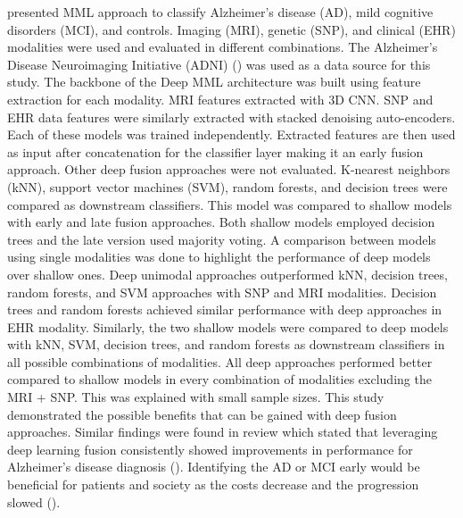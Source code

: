 \cite{alzmulti} presented MML approach to classify Alzheimer’s disease (AD), mild cognitive disorders (MCI), and controls. Imaging (MRI), genetic (SNP), and clinical (EHR) modalities were used and evaluated in different combinations. The Alzheimer’s Disease Neuroimaging Initiative (ADNI) (\cite{ADNI}) was used as a data source for this study. The backbone of the Deep MML architecture was built using feature extraction for each modality. MRI features extracted with 3D CNN. SNP and EHR data features were similarly extracted with stacked denoising auto-encoders. Each of these models was trained independently. Extracted features are then used as input after concatenation for the classifier layer making it an early fusion approach. Other deep fusion approaches were not evaluated. K-nearest neighbors (kNN), support vector machines (SVM), random forests, and decision trees were compared as downstream classifiers. This model was compared to shallow models with early and late fusion approaches. Both shallow models employed decision trees and the late version used majority voting. A comparison between models using single modalities was done to highlight the performance of deep models over shallow ones. Deep unimodal approaches outperformed kNN, decision trees, random forests, and SVM approaches with SNP and MRI modalities. Decision trees and random forests achieved similar performance with deep approaches in EHR modality. Similarly, the two shallow models were compared to deep models with kNN, SVM, decision trees, and random forests as downstream classifiers in all possible combinations of modalities. All deep approaches performed better compared to shallow models in every combination of modalities excluding the MRI + SNP. This was explained with small sample sizes. This study demonstrated the possible benefits that can be gained with deep fusion approaches. Similar findings were found in review which stated that leveraging deep learning fusion consistently showed improvements in performance for Alzheimer's disease diagnosis (\cite{article22}). Identifying the AD or MCI early would be beneficial for patients and society as the costs decrease and the progression slowed (\cite{rasmussen2019alzheimer}).


